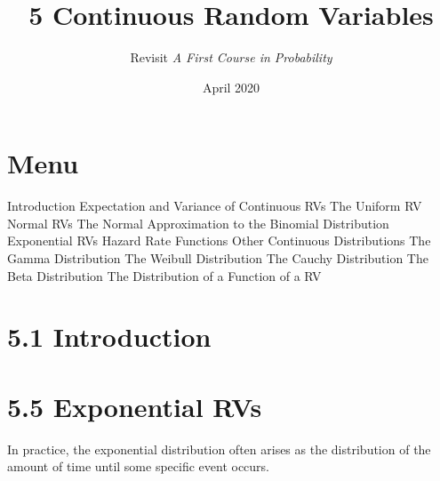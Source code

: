 \documentclass{article}
\title{5 Continuous Random Variables}
\author{Revisit \emph{A First Course in Probability}}
\date{April 2020}
\begin{document}
\maketitle

\section*{Menu}
\begin{outline}[enumerate]
    \1  Introduction
    \1  Expectation and Variance of Continuous RVs 
    \1  The Uniform RV
    \1  Normal RVs
        \2 The Normal Approximation to the Binomial Distribution
    \1  Exponential RVs
        \2 Hazard Rate Functions
    \1  Other Continuous Distributions
        \2 The Gamma Distribution
        \2 The Weibull Distribution
        \2 The Cauchy Distribution
        \2 The Beta Distribution
    \1  The Distribution of a Function of a RV
\end{outline}


\section*{5.1 Introduction}
\section*{5.5 Exponential RVs}
In practice, the exponential distribution often arises as the distribution of the amount of time until some specific event occurs.





\end{document}
